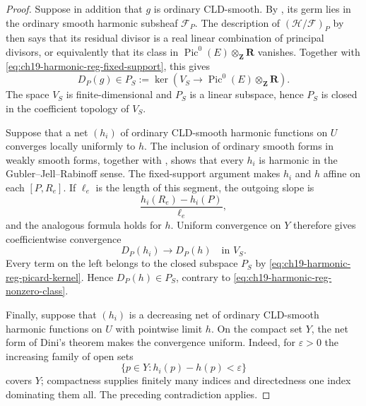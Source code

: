 \begin{proof}
Suppose in addition that $g$ is ordinary CLD-smooth.  By
\cite[Remark~15.10]{GJR26}, its germ lies in the ordinary smooth harmonic
subsheaf $\mathcal F_P$.  The description of
$(\mathcal H/\mathcal F)_P$ by \cite[Lemma~2.3.22]{Thu05} then says that its
residual divisor is a real linear combination of principal divisors, or
equivalently that its class in
$\operatorname{Pic}^0(E)\otimes_{\mathbf Z}\mathbf R$ vanishes.  Together
with \eqref{eq:ch19-harmonic-reg-fixed-support}, this gives
\begin{equation}
\label{eq:ch19-harmonic-reg-picard-kernel}
 D_P(g)\in
 P_S:=\ker\!\left(
 V_S\longrightarrow\operatorname{Pic}^0(E)\otimes_{\mathbf Z}\mathbf R
 \right).
\end{equation}
The space $V_S$ is finite-dimensional and $P_S$ is a linear subspace, hence
$P_S$ is closed in the coefficient topology of $V_S$.

Suppose that a net $(h_i)$ of ordinary CLD-smooth harmonic functions on $U$
converges locally uniformly to $h$.  The inclusion of ordinary smooth forms
in weakly smooth forms, together with \cite[Propositions~10.14 and
10.17]{GJR26}, shows that every $h_i$ is harmonic in the
Gubler--Jell--Rabinoff sense.  The fixed-support argument makes $h_i$ and $h$
affine on each $[P,R_e]$.  If $\ell_e$ is the length of this segment, the
outgoing slope is
\begin{equation}
\label{eq:ch19-harmonic-reg-slope-values}
                         \frac{h_i(R_e)-h_i(P)}{\ell_e},
\end{equation}
and the analogous formula holds for $h$.  Uniform convergence on $Y$
therefore gives coefficientwise convergence
\begin{equation}
\label{eq:ch19-harmonic-reg-divisor-limit}
                         D_P(h_i)\longrightarrow D_P(h)
                         \quad\text{in }V_S.
\end{equation}
Every term on the left belongs to the closed subspace $P_S$ by
\eqref{eq:ch19-harmonic-reg-picard-kernel}.  Hence $D_P(h)\in P_S$, contrary
to \eqref{eq:ch19-harmonic-reg-nonzero-class}.

Finally, suppose that $(h_i)$ is a decreasing net of ordinary CLD-smooth
harmonic functions on $U$ with pointwise limit $h$.  On the compact set $Y$,
the net form of Dini's theorem makes the convergence uniform.  Indeed, for
$\varepsilon>0$ the increasing family of open sets
\[
              \{p\in Y:h_i(p)-h(p)<\varepsilon\}
\]
covers $Y$; compactness supplies finitely many indices and directedness one
index dominating them all.  The preceding contradiction applies.
\end{proof}
